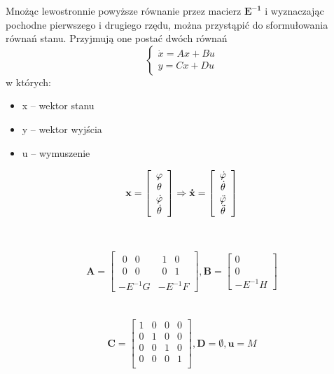 Mnożąc lewostronnie powyższe równanie przez macierz $\mathbf{E^{-1}}$ i wyznaczając pochodne pierwszego i drugiego rzędu, można przystąpić do sformułowania równań stanu. Przyjmują one postać dwóch równań
\begin{equation}
    \left\{
    \begin{array}{ll}
    \dot{x} = Ax + Bu \\
    y = Cx + Du
    \end{array}
    \right.
\end{equation}
w których:
\begin{itemize}
    \item x -- wektor stanu
    \item y -- wektor wyjścia
    \item u -- wymuszenie
\end{itemize}

$$
\mathbf{x} =
\left[ \begin{array}{c}
\varphi \\
\theta \\
\dot{\varphi} \\
\dot{\theta}
\end{array} \right]
\Rightarrow
\mathbf{\dot{x}} =
\left[ \begin{array}{c}
\dot{\varphi} \\
\dot{\theta} \\
\Ddot{\varphi} \\
\Ddot{\theta}
\end{array} \right]
$$
\\ \\
$$
\mathbf{A} =
\left[ \begin{array}{c|ccc}
\begin{array}{cc}
0 & 0 \\
0 & 0
\end{array}
& 
\begin{array}{cc}
1 & 0 \\
0 & 1
\end{array} \\
\hline
-E^{-1}G & -E^{-1}F
\end{array} \right] 
,
\mathbf{B} =
\left[ \begin{array}{c}
0 \\
0 \\
-E^{-1}H
\end{array} \right] 
$$
\\ \\
$$
\mathbf{C} =
\left[ \begin{array}{cccc}
1 & 0 & 0 & 0 \\
0 & 1 & 0 & 0 \\
0 & 0 & 1 & 0 \\
0 & 0 & 0 & 1 \\
\end{array} \right] 
,
\mathbf{D} = \emptyset
, 
\mathbf{u} = M
$$

